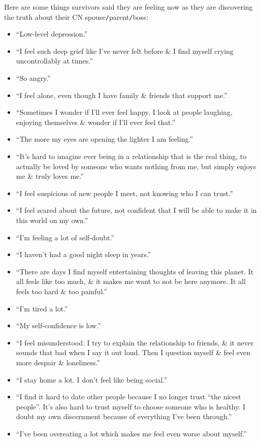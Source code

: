 \documentclass{article}
\numberwithin{equation}{section}
\begin{document}
Here are some things survivors said they are feeling now as they are discovering the truth about their CN spouse{\tt/}parent{\tt/}boss:
\begin{itemize}
	\item ``Low-level depression.''
	\item ``I feel such deep grief like I've never felt before \& I find myself crying uncontrollably at times.''
	\item ``So angry.''
	\item ``I feel alone, even though I have family \& friends that support me.''
	\item ``Sometimes I wonder if I'll ever feel happy. I look at people laughing, enjoying themselves \& wonder if I'll ever feel that.''
	\item ``The more my eyes are opening the lighter I am feeling.''
	\item ``It's hard to imagine ever being in a relationship that is the real thing, to actually be loved by someone who wants nothing from me, but simply enjoys me \& truly loves me.''
	\item ``I feel suspicious of new people I meet, not knowing who I can trust.''
	\item ``I feel scared about the future, not confident that I will be able to make it in this world on my own.''
	\item ``I'm feeling a lot of self-doubt.''
	\item ``I haven't had a good night sleep in years.''
	\item ``There are days I find myself entertaining thoughts of leaving this planet. It all feels like too much, \& it makes me want to not be here anymore. It all feels too hard \& too painful.''
	\item ``I'm tired a lot.''
	\item ``My self-confidence is low.''
	\item ``I feel misunderstood. I try to explain the relationship to friends, \& it never sounds that bad when I say it out loud. Then I question myself \& feel even more despair \& loneliness.''
	\item ``I stay home a lot. I don't feel like being social.''
	\item ``I find it hard to date other people because I no longer trust ``the nicest people''. It's also hard to trust myself to choose someone who is healthy. I doubt my own discernment because of everything I've been through.''
	\item ``I've been overeating a lot which makes me feel even worse about myself.''

\end{itemize}
\end{document}
